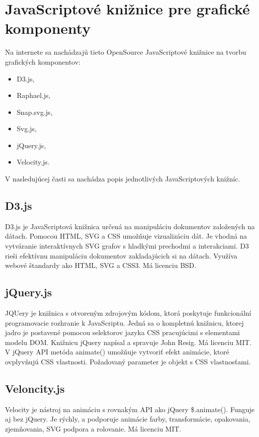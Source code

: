 \section{JavaScriptové knižnice pre grafické komponenty}
Na internete sa nachádzajú tieto OpenSource JavaScriptové knižnice na tvorbu grafických komponentov: 
\begin{itemize}
	\item \acs{D3}.js, 
	\item Raphael.js, \item Snap.svg.js,  
	\item Svg.js, 
    \item jQuery.js, \item Velocity.js.
\end{itemize}

V nasledujúcej časti sa nachádza popis jednotlivých JavaScriptových knižníc.
\subsection{D3.js}
D3.js je JavaScriptová knižnica určená na manipuláciu dokumentov založených na dátach. Pomocou \acs{HTML}, \acs{SVG} a \acs{CSS} umožňuje vizualizáciu dát. Je vhodná na vytváranie interaktívnych SVG grafov s hladkými prechodmi a interakciami.  D3 rieši efektívnu manipuláciu dokumentov zakladajúcich si na dátach. Využíva webové štandardy ako \acs{HTML}, \acs{SVG} a \acs{CSS}3. \cite{d3js} Má licenciu BSD.

\subsection{jQuery.js}
JQUery je knižnica s otvoreným zdrojovým kódom, ktorá poskytuje funkcionální programovacie rozhranie k JavaScriptu. Jedná sa o kompletnú knižnicu, ktorej jadro je postavené pomocou selektorov jazyka \acs{CSS} pracujúcimi s elementami modelu \acs{DOM}. Knižnicu jQuery napísal a spravuje John Resig. Má licenciu MIT.  \cite{Zakas}  
V jQuery API metóda animate() umožňuje vytvoriť efekt animácie, ktoré ovplyvňujú CSS vlastnosti. Požadovaný parameter je objekt s CSS vlastnosťami. \cite{jquery}

\subsection{Veloncity.js}
Velocity je nástroj na animáciu s rovnakým \acs{API} ako jQuery  \$.animate(). Funguje aj bez jQuery. Je rýchly, a podporuje animácie farby, transformácie, opakovania, zjemňovania, SVG podpora a rolovanie. \cite{velocity}
Má licenciu MIT. 

